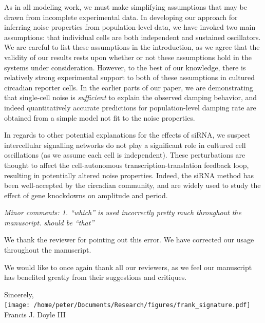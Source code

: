 \documentclass[11pt, letterpaper]{article}
\newenvironment{reviewer}{\itshape\color{gray}}{}
\begin{document}
As in all modeling work, we must make simplifying assumptions that may be drawn from incomplete experimental data.
In developing our approach for inferring noise properties from population-level data, we have invoked two main assumptions: that individual cells are both independent and sustained oscillators.
We are careful to list these assumptions in the introduction, as we agree that the validity of our results rests upon whether or not these assumptions hold in the systems under consideration.
However, to the best of our knowledge, there is relatively strong experimental support to both of these assumptions in cultured circadian reporter cells.
In the earlier parts of our paper, we are demonstrating that single-cell noise is {\itshape sufficient} to explain the observed damping behavior, and indeed quantitatively accurate predictions for population-level damping rate are obtained from a simple model not fit to the noise properties.

In regards to other potential explanations for the effects of siRNA, we suspect intercellular signalling networks do not play a significant role in cultured cell oscillations (as we assume each cell is independent).
These perturbations are thought to affect the cell-autonomous transcription-translation feedback loop, resulting in potentially altered noise properties.
Indeed, the siRNA method has been well-accepted by the circadian community, and are widely used to study the effect of gene knockdowns on amplitude and period.


\begin{reviewer}
Minor comments:
1. ``which'' is used incorrectly pretty much throughout the manuscript. should be ``that''
\end{reviewer}

We thank the reviewer for pointing out this error. We have corrected our usage throughout the manuscript.

We would like to once again thank all our reviewers, as we feel our manuscript has benefited greatly from their suggestions and critiques.

\vspace{4ex}
\begin{flushright}
  Sincerely,\\[2ex]

  \texttt{[image: /home/peter/Documents/Research/figures/frank\_signature.pdf]}\\[1ex]
Francis J. Doyle III
\end{flushright}
\end{document}
